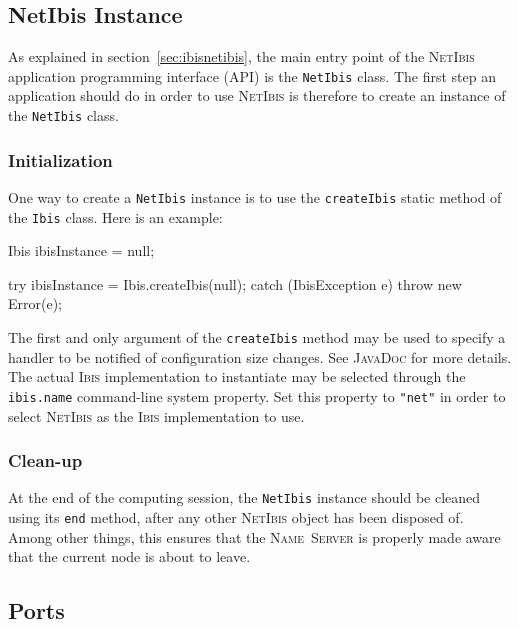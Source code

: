 \documentclass[11pt]{book}
\def\Ibis{\textsc{Ibis}\xspace}
\def\NetIbis{\textsc{NetIbis}\xspace}
\def\netibis{\texttt{NetIbis}\xspace}
\def\jd{\textsc{JavaDoc}\xspace}
\def\ins{\textsc{Name~Server}\xspace}
\begin{document}
\subsection{NetIbis Instance}
\label{sec:netibis-instance}

As explained in section~\ref{sec:ibisnetibis}, the main entry point of
the \NetIbis application programming interface (API) is the \netibis
class. The first step an application should do in order to use
\NetIbis is therefore to create an instance of the \netibis class.

%
\subsubsection{Initialization}
\label{sec:initialization}

One way to create a \netibis instance is to use the
\texttt{createIbis} static method of the \texttt{Ibis} class. Here is
an example:

\begin{Miniverb}

  Ibis ibisInstance = null;

  try {
    ibisInstance = Ibis.createIbis(null);
  } catch (IbisException e) {
    throw new Error(e);
  }

\end{Miniverb}

The first and only argument of the \texttt{createIbis} method may be
used to specify a handler to be notified of configuration size
changes. See \jd for more details. The actual \Ibis implementation to
instantiate may be selected through the \texttt{ibis.name}
command-line system property. Set this property to \texttt{"net"} in
order to select \NetIbis as the \Ibis implementation to use.

%
\subsubsection{Clean-up}
\label{sec:clean-up}

At the end of the computing session, the \netibis instance should be
cleaned using its \texttt{end} method, after any other \NetIbis object
has been disposed of. Among other things, this ensures that the \ins
is properly made aware that the current node is about to leave.

\subsection{Ports}
\label{sec:ports}
\end{document}
